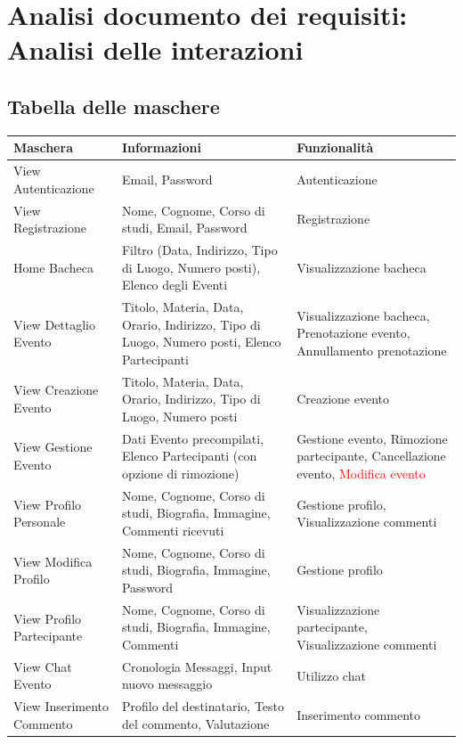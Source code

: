 \documentclass[12pt,a4paper]{report}
\begin{document}
\newpage
\section{Analisi documento dei requisiti: Analisi delle interazioni}

\subsection{Tabella delle maschere}
\begin{tabularx}{\textwidth}{|p{4.5cm}|X|p{4cm}|}
    \hline
    \rowcolor{studyColor} \textbf{Maschera} & \textbf{Informazioni} & \textbf{Funzionalità} \\ \hline
    \endhead
    View Autenticazione & Email, Password & Autenticazione \\ \hline
    View Registrazione & Nome, Cognome, Corso di studi, Email, Password & Registrazione \\ \hline
    Home Bacheca & Filtro (Data, Indirizzo, Tipo di Luogo, Numero posti), Elenco degli Eventi & Visualizzazione bacheca \\ \hline
    View Dettaglio Evento & Titolo, Materia, Data, Orario, Indirizzo, Tipo di Luogo, Numero posti, Elenco Partecipanti & Visualizzazione bacheca, Prenotazione evento, Annullamento prenotazione \\ \hline
    View Creazione Evento & Titolo, Materia, Data, Orario, Indirizzo, Tipo di Luogo, Numero posti & Creazione evento \\ \hline
    View Gestione Evento & Dati Evento precompilati, Elenco Partecipanti (con opzione di rimozione) & Gestione evento, Rimozione partecipante, Cancellazione evento, \textcolor{red}{Modifica evento} \\ \hline
    View Profilo Personale & Nome, Cognome, Corso di studi, Biografia, Immagine, Commenti ricevuti & Gestione profilo, Visualizzazione commenti \\ \hline
    View Modifica Profilo & Nome, Cognome, Corso di studi, Biografia, Immagine, Password & Gestione profilo \\ \hline
    View Profilo Partecipante & Nome, Cognome, Corso di studi, Biografia, Immagine, Commenti & Visualizzazione partecipante, Visualizzazione commenti \\ \hline
    View Chat Evento & Cronologia Messaggi, Input nuovo messaggio & Utilizzo chat \\ \hline
    View Inserimento Commento & Profilo del destinatario, Testo del commento, Valutazione & Inserimento commento \\ \hline
\end{tabularx}
\end{document}
